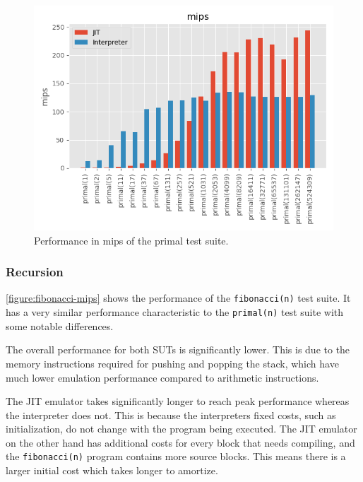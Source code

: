 \begin{figure}[h]
    \centering
    \includegraphics[scale=0.75]{output/graphs/tests/primal/mips.png}
    \caption{Performance in mips of the primal test suite.}
    \label{figure:primal-mips}
\end{figure}

\subsubsection{Recursion}

\autoref{figure:fibonacci-mips} shows the performance of the \texttt{fibonacci(n)} test suite. It has a very similar performance characteristic to the \texttt{primal(n)} test suite with some notable differences.

The overall performance for both SUTs is significantly lower. This is due to the memory instructions required for pushing and popping the stack, which have much lower emulation performance compared to arithmetic instructions.

The JIT emulator takes significantly longer to reach peak performance whereas the interpreter does not. This is because the interpreters fixed costs, such as initialization, do not change with the program being executed. The JIT emulator on the other hand has additional costs for every block that needs compiling, and the \texttt{fibonacci(n)} program contains more source blocks. This means there is a larger initial cost which takes longer to amortize.

